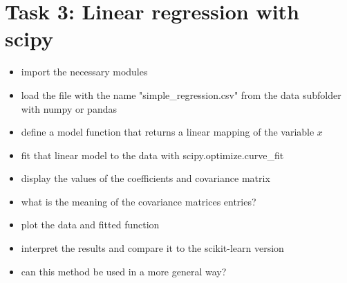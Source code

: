 \documentclass{article}
\begin{document}
\section*{Task 3: Linear regression with scipy}
\begin{itemize}
    \item import the necessary modules
    \item load the file with the name "simple\_regression.csv" from the data subfolder with numpy or pandas 
    \item define a model function that returns a linear mapping of the variable $x$
    \item fit that linear model to the data with scipy.optimize.curve\_fit
    \item display the values of the coefficients and covariance matrix
    \item what is the meaning of the covariance matrices entries?
    \item plot the data and fitted function
    \item interpret the results and compare it to the scikit-learn version
    \item can this method be used in a more general way?
\end{itemize}

%
%
\end{document}
